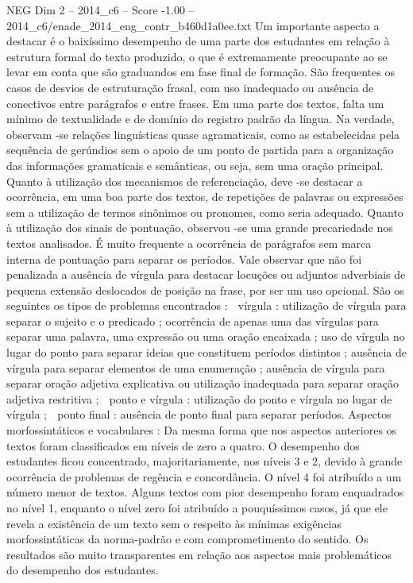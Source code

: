\begin{textsample}{NEG Dim 2 – 2014\_c6 – Score -1.00 – 2014\_c6/enade\_2014\_eng\_contr\_b460d1a0ee.txt}
Um importante aspecto a destacar é o baixíssimo desempenho de uma parte dos estudantes em relação à estrutura formal do texto produzido, o que é extremamente preocupante ao se levar em conta que são graduandos em fase final de formação.
São frequentes os casos de desvios de estruturação frasal, com uso inadequado ou ausência de conectivos entre parágrafos e entre frases.
Em uma parte dos textos, falta um mínimo de textualidade e de domínio do registro padrão da língua.
Na verdade, observam -se relações linguísticas quase agramaticais, como as estabelecidas pela sequência de gerúndios sem o apoio de um ponto de partida para a organização das informações gramaticais e semânticas, ou seja, sem uma oração principal.
Quanto à utilização dos mecanismos de referenciação, deve -se destacar a ocorrência, em uma boa parte dos textos, de repetições de palavras ou expressões sem a utilização de termos sinônimos ou pronomes, como seria adequado.
Quanto à utilização dos sinais de pontuação, observou -se uma grande precariedade nos textos analisados.
É muito frequente a ocorrência de parágrafos sem marca interna de pontuação para separar os períodos.
Vale observar que não foi penalizada a ausência de vírgula para destacar locuções ou adjuntos adverbiais de pequena extensão deslocados de posição na frase, por ser um uso opcional.
São os seguintes os tipos de problemas encontrados :  vírgula : utilização de vírgula para separar o sujeito e o predicado ; ocorrência de apenas uma das vírgulas para separar uma palavra, uma expressão ou uma oração encaixada ; uso de vírgula no lugar do ponto para separar ideias que constituem períodos distintos ; ausência de vírgula para separar elementos de uma enumeração ; ausência de vírgula para separar oração adjetiva explicativa ou utilização inadequada para separar oração adjetiva restritiva ;  ponto e vírgula : utilização do ponto e vírgula no lugar de vírgula ;  ponto final : ausência de ponto final para separar períodos.
Aspectos morfossintáticos e vocabulares : Da mesma forma que nos aspectos anteriores os textos foram classificados em níveis de zero a quatro.
O desempenho dos estudantes ficou concentrado, majoritariamente, nos níveis 3 e 2, devido à grande ocorrência de problemas de regência e concordância.
O nível 4 foi atribuído a um número menor de textos.
Alguns textos com pior desempenho foram enquadrados no nível 1, enquanto o nível zero foi atribuído a pouquíssimos casos, já que ele revela a existência de um texto sem o respeito às mínimas exigências morfossintáticas da norma-padrão e com comprometimento do sentido.
Os resultados são muito transparentes em relação aos aspectos mais problemáticos do desempenho dos estudantes.

\end{textsample}
